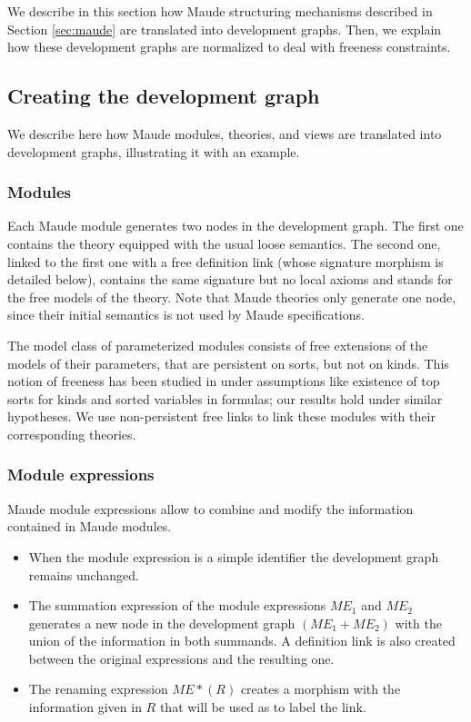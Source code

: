 
We describe in this section how Maude structuring mechanisms
described in Section \ref{sec:maude}
are translated into development graphs. Then, we explain how these development
graphs are normalized to deal with freeness constraints.

\subsection{Creating the development graph}
We describe here how Maude modules, theories, and views are translated into
development graphs, illustrating it with an example.

\subsubsection{Modules}

Each Maude module generates two nodes in the development
graph. The first one contains the theory equipped with the usual
loose semantics. The second one, linked
to the first one with a free definition link (whose signature morphism
is detailed below), contains the same signature but
no local axioms and stands for the free models of the theory.
Note that Maude theories only generate one node, since their initial
semantics is not used by Maude specifications.

The model class of parameterized modules
consists of free extensions of the models of their parameters, that are
persistent on sorts, but not on kinds. This notion of freeness has been 
studied in \cite{BouhoulaJM00} under assumptions like existence of top sorts for kinds
and sorted variables in formulas; our results hold under similar
hypotheses. We use non-persistent free links to link these modules with
their corresponding theories.

\subsubsection{Module expressions}\label{subsec:me}

Maude module expressions allow to combine and modify the information
contained in Maude modules.

\begin{itemize}

\item
When the module expression is a simple identifier the development
graph remains unchanged.

\item
The summation expression of the module expressions $\mathit{ME}_1$ and
$\mathit{ME}_2$ generates a new node in the development graph
$(\mathit{ME}_1 + \mathit{ME}_2)$ with
the union of the information in both summands. A definition link
is also created between the original expressions and the resulting one.

\item
The renaming expression $\mathit{ME} * (R)$ creates a morphism with
the information given in $R$ that will be used as to label the link.

\end{itemize}

